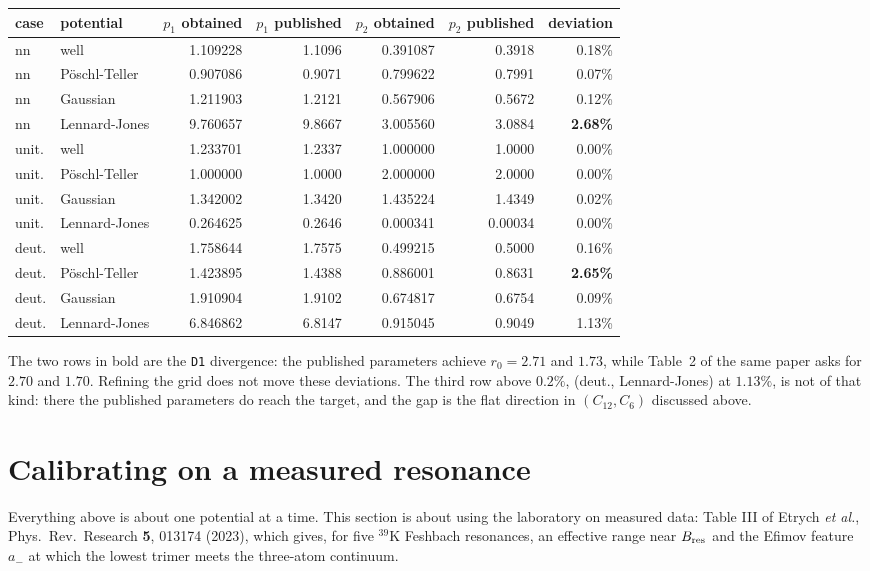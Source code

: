 \documentclass[11pt,a4paper]{article}
\begin{document}
\begin{center}
\footnotesize
\begin{tabular}{llrrrrr}
\toprule
case & potential & $p_1$ obtained & $p_1$ published & $p_2$ obtained & $p_2$ published & deviation \\
\midrule
nn & well          & 1.109228 & 1.1096 & 0.391087 & 0.3918 & 0.18\% \\
nn & Pöschl-Teller & 0.907086 & 0.9071 & 0.799622 & 0.7991 & 0.07\% \\
nn & Gaussian      & 1.211903 & 1.2121 & 0.567906 & 0.5672 & 0.12\% \\
nn & Lennard-Jones & 9.760657 & 9.8667 & 3.005560 & 3.0884 & \textbf{2.68\%} \\
\addlinespace
unit. & well          & 1.233701 & 1.2337 & 1.000000 & 1.0000 & 0.00\% \\
unit. & Pöschl-Teller & 1.000000 & 1.0000 & 2.000000 & 2.0000 & 0.00\% \\
unit. & Gaussian      & 1.342002 & 1.3420 & 1.435224 & 1.4349 & 0.02\% \\
unit. & Lennard-Jones & 0.264625 & 0.2646 & 0.000341 & 0.00034 & 0.00\% \\
\addlinespace
deut. & well          & 1.758644 & 1.7575 & 0.499215 & 0.5000 & 0.16\% \\
deut. & Pöschl-Teller & 1.423895 & 1.4388 & 0.886001 & 0.8631 & \textbf{2.65\%} \\
deut. & Gaussian      & 1.910904 & 1.9102 & 0.674817 & 0.6754 & 0.09\% \\
deut. & Lennard-Jones & 6.846862 & 6.8147 & 0.915045 & 0.9049 & 1.13\% \\
\bottomrule
\end{tabular}
\end{center}
\noindent
The two rows in bold are the \texttt{D1} divergence: the published parameters
achieve $r_0 = 2.71$ and $1.73$, while Table~2 of the same paper asks for $2.70$
and $1.70$. Refining the grid does not move these deviations. The third row
above $0.2\%$, (deut., Lennard-Jones) at $1.13\%$, is not of that kind: there
the published parameters do reach the target, and the gap is the flat direction
in $(C_{12}, C_6)$ discussed above.

\section{Calibrating on a measured resonance}

Everything above is about one potential at a time. This section is about using
the laboratory on measured data: Table III of Etrych \textit{et al.},
Phys.\ Rev.\ Research \textbf{5}, 013174 (2023), which gives, for five
$^{39}$K Feshbach resonances, an effective range near $B_{\rm res}$ and the
Efimov feature $a_-$ at which the lowest trimer meets the three-atom
continuum.
\end{document}

